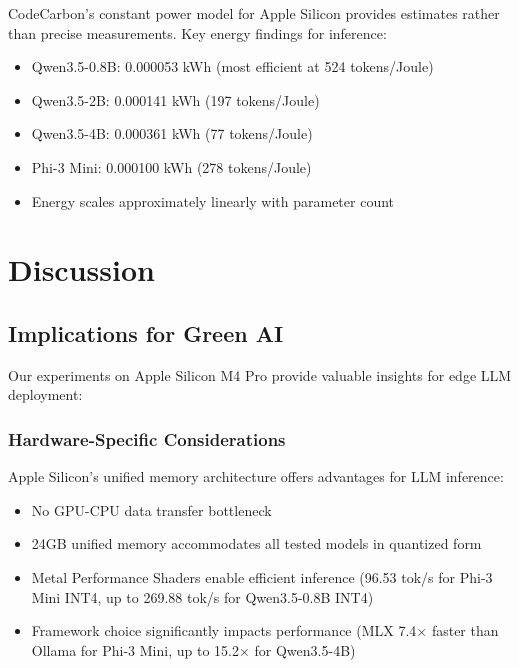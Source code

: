 \documentclass[11pt,a4paper]{article}
\begin{document}
CodeCarbon's constant power model for Apple Silicon provides estimates rather than precise measurements. Key energy findings for inference:

\begin{itemize}[leftmargin=*,nosep]
    \item Qwen3.5-0.8B: 0.000053 kWh (most efficient at 524 tokens/Joule)
    \item Qwen3.5-2B: 0.000141 kWh (197 tokens/Joule)
    \item Qwen3.5-4B: 0.000361 kWh (77 tokens/Joule)
    \item Phi-3 Mini: 0.000100 kWh (278 tokens/Joule)
    \item Energy scales approximately linearly with parameter count
\end{itemize}
\section{Discussion}

\subsection{Implications for Green AI}

Our experiments on Apple Silicon M4 Pro provide valuable insights for edge LLM deployment:

\subsubsection{Hardware-Specific Considerations}

Apple Silicon's unified memory architecture offers advantages for LLM inference:

\begin{itemize}[leftmargin=*,nosep]
    \item No GPU-CPU data transfer bottleneck
    \item 24GB unified memory accommodates all tested models in quantized form
    \item Metal Performance Shaders enable efficient inference (96.53 tok/s for Phi-3 Mini INT4, up to 269.88 tok/s for Qwen3.5-0.8B INT4)
    \item Framework choice significantly impacts performance (MLX 7.4$\times$ faster than Ollama for Phi-3 Mini, up to 15.2$\times$ for Qwen3.5-4B)
\end{itemize}
\end{document}
